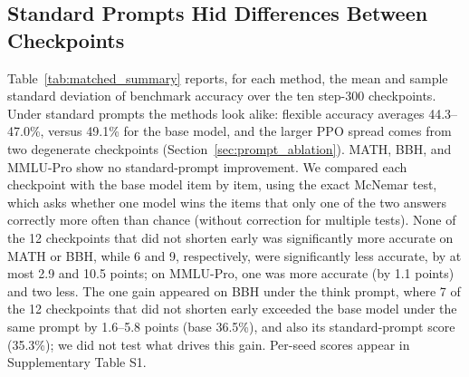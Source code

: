 \documentclass[ai,article,submit,oneauthor]{Definitions/mdpi}
\begin{document}
\subsection{Standard Prompts Hid Differences Between Checkpoints}\label{sec:prompt_results}

Table~\ref{tab:matched_summary} reports, for each method, the mean and sample standard deviation of benchmark accuracy over the ten step-300 checkpoints. Under standard prompts the methods look alike: flexible accuracy averages 44.3--47.0\%, versus 49.1\% for the base model, and the larger PPO spread comes from two degenerate checkpoints (Section~\ref{sec:prompt_ablation}). MATH, BBH, and MMLU-Pro show no standard-prompt improvement. We compared each checkpoint with the base model item by item, using the exact McNemar test, which asks whether one model wins the items that only one of the two answers correctly more often than chance (without correction for multiple tests). None of the 12 checkpoints that did not shorten early was significantly more accurate on MATH or BBH, while 6 and 9, respectively, were significantly less accurate, by at most 2.9 and 10.5 points; on MMLU-Pro, one was more accurate (by 1.1 points) and two less. The one gain appeared on BBH under the think prompt, where 7 of the 12 checkpoints that did not shorten early exceeded the base model under the same prompt by 1.6--5.8 points (base 36.5\%), and also its standard-prompt score (35.3\%); we did not test what drives this gain. Per-seed scores appear in Supplementary Table S1.

\begin{table}[H]
\centering
\caption{Benchmark accuracy (\%), with equal weight for GSM8K, MATH, BBH, and MMLU-Pro. Parentheses show sample standard deviations across the ten seeds. Strict scoring requires a recognized final-answer format; flexible scoring additionally permits fallback extraction from completed responses.}
\label{tab:matched_summary}
\end{table}
\end{document}

